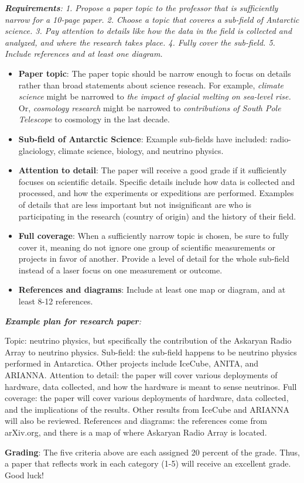 \documentclass[10pt]{article}
\begin{document}
\maketitle

\noindent
\textit{\textbf{Requirements}: 1. Propose a paper topic to the professor that is sufficiently narrow for a 10-page paper.  2. Choose a topic that coveres a sub-field of Antarctic science.  3. Pay attention to details like how the data in the field is collected and analyzed, and where the research takes place.  4. Fully cover the sub-field.  5. Include references and at least one diagram.} \\
\begin{itemize}
\item\textbf{Paper topic}: The paper topic should be narrow enough to focus on details rather than broad statements about science reseach.  For example, \textit{climate science} might be narrowed to \textit{the impact of glacial melting on sea-level rise.}  Or, \textit{cosmology research} might be narrowed to \textit{contributions of South Pole Telescope} to cosmology in the last decade.
\item \textbf{Sub-field of Antarctic Science}: Example sub-fields have included: radio-glaciology, climate science, biology, and neutrino physics.
\item \textbf{Attention to detail}: The paper will receive a good grade if it sufficiently focuses on scientific details.  Specific details include how data is collected and processed, and how the experiments or expeditions are performed.  Examples of details that are less important but not insignificant are who is participating in the research (country of origin) and the history of their field.
\item \textbf{Full coverage}: When a sufficiently narrow topic is chosen, be sure to fully cover it, meaning do not ignore one group of scientific measurements or projects in favor of another.  Provide a level of detail for the whole sub-field instead of a laser focus on one measurement or outcome.
\item \textbf{References and diagrams}: Include at least one map or diagram, and at least 8-12 references.
\end{itemize}
\textit{\textbf{Example plan for research paper}:}
\begin{outline}[enumerate]
\1 Topic: neutrino physics, but specifically the contribution of the Askaryan Radio Array to neutrino physics.
\1 Sub-field: the sub-field happens to be neutrino physics performed in Antarctica.  Other projects include IceCube, ANITA, and ARIANNA.
\1 Attention to detail: the paper will cover various deployments of hardware, data collected, and how the hardware is meant to sense neutrinos.
\1 Full coverage: the paper will cover various deployments of hardware, data collected, and the implications of the results.  Other results from IceCube and ARIANNA will also be reviewed.
\1 References and diagrams: the references come from arXiv.org, and there is a map of where Askaryan Radio Array is located.
\end{outline}
\textbf{Grading}: The five criteria above are each assigned 20 percent of the grade.  Thus, a paper that reflects work in each category (1-5) will receive an excellent grade.  Good luck!
\end{document}
